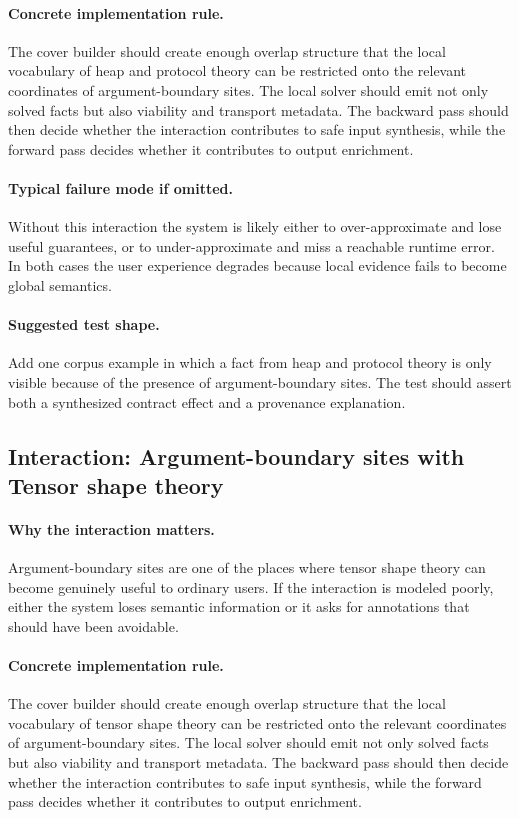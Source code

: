 \documentclass[11pt]{report}
\theoremstyle{definition}
\theoremstyle{plain}
\begin{document}
\paragraph{Concrete implementation rule.}
The cover builder should create enough overlap structure that the local
vocabulary of heap and protocol theory can be restricted onto the relevant
coordinates of argument-boundary sites. The local solver should emit not only
solved facts but also viability and transport metadata. The backward pass
should then decide whether the interaction contributes to safe input
synthesis, while the forward pass decides whether it contributes to output
enrichment.

\paragraph{Typical failure mode if omitted.}
Without this interaction the system is likely either to over-approximate and
lose useful guarantees, or to under-approximate and miss a reachable runtime
error. In both cases the user experience degrades because local evidence
fails to become global semantics.

\paragraph{Suggested test shape.}
Add one corpus example in which a fact from heap and protocol theory is only
visible because of the presence of argument-boundary sites. The test should
assert both a synthesized contract effect and a provenance explanation.

\subsection{Interaction: Argument-boundary sites with Tensor shape theory}

\paragraph{Why the interaction matters.}
Argument-boundary sites are one of the places where tensor shape theory can become
genuinely useful to ordinary users. If the interaction is modeled poorly,
either the system loses semantic information or it asks for annotations that
should have been avoidable.

\paragraph{Concrete implementation rule.}
The cover builder should create enough overlap structure that the local
vocabulary of tensor shape theory can be restricted onto the relevant
coordinates of argument-boundary sites. The local solver should emit not only
solved facts but also viability and transport metadata. The backward pass
should then decide whether the interaction contributes to safe input
synthesis, while the forward pass decides whether it contributes to output
enrichment.
\end{document}
